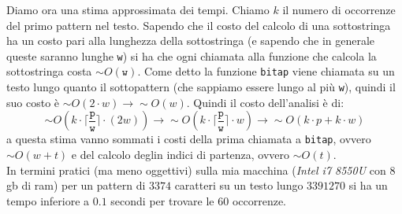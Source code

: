 \documentclass[a4paper,12pt, oneside]{article}
\begin{document}
Diamo ora una stima approssimata dei tempi. Chiamo $k$ il numero di
occorrenze del primo pattern nel testo. Sapendo che il costo del
calcolo di una sottostringa ha un costo pari alla lunghezza della
sottostringa (e sapendo che in generale queste saranno lunghe
\texttt{w}) si ha che ogni chiamata alla funzione che calcola la
sottostringa costa $\sim O(\mathtt{w})$. Come detto la funzione
\texttt{bitap} viene chiamata su un testo lungo quanto il sottopattern
(che sappiamo essere lungo al più \texttt{w}), 
quindi il suo costo è $\sim O(2\cdot w)\to\sim O(w)$. Quindi il costo
dell'analisi è di:
\[\sim O(k\cdot \Big\lceil
  \frac{\mathtt{p}}{\mathtt{w}}\Big\rceil\cdot (2w))
  \to\sim O(k\cdot \Big\lceil
  \frac{\mathtt{p}}{\mathtt{w}}\Big\rceil\cdot w)
\to \sim O(k\cdot p+k\cdot w)\]
a questa stima vanno sommati i costi della prima chiamata a
\texttt{bitap}, ovvero $\sim O(w + t)$ e del calcolo deglin indici di
partenza, ovvero $\sim O(t)$.\\
In termini pratici (ma meno oggettivi) sulla mia macchina
(\textit{Intel i7 8550U} con $8$gb di ram) per un pattern di $3374$
caratteri su un testo lungo $3391270$ si ha un tempo inferiore a $0.1$
secondi per trovare le $60$ occorrenze.
\end{document}
